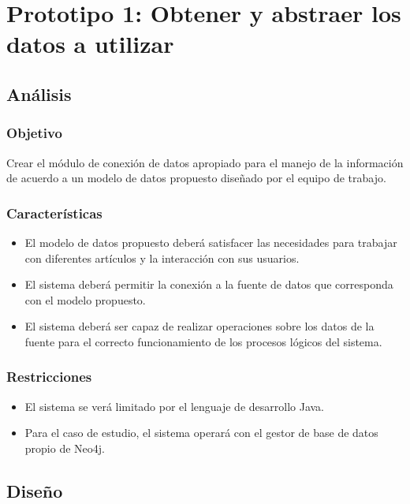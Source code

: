 \chapter{Prototipo 1: Obtener y abstraer los datos a utilizar}
  \section{Análisis}
    \subsection{Objetivo}
      Crear el módulo de conexión de datos apropiado para el manejo de la información de acuerdo a un modelo de datos propuesto diseñado por el equipo de trabajo.

    \subsection{Características}
      \begin{itemize}
        \item El modelo de datos propuesto deberá satisfacer las necesidades para trabajar con diferentes artículos y la interacción con sus usuarios.
        \item El sistema deberá permitir la conexión a la fuente de datos que corresponda con el modelo propuesto.
        \item El sistema deberá ser capaz de realizar operaciones sobre los datos de la fuente para el correcto funcionamiento de los procesos lógicos del sistema.
      \end{itemize}

    \subsection{Restricciones}
      \begin{itemize}
        \item El sistema se verá limitado por el lenguaje de desarrollo Java.
        \item Para el caso de estudio, el sistema operará con el gestor de base de datos propio de Neo4j. 
      \end{itemize}

  \section{Diseño}
